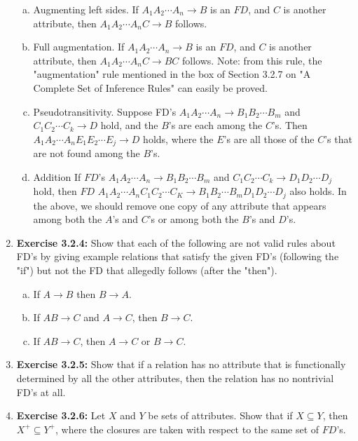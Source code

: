 \documentclass[12pt]{article}
\begin{document}
\begin{enumerate}[1.]
    \begin{enumerate}[a)]
        \item Augmenting left sides. If $A_1 A_2 \cdots A_n \to B$ is an $FD$, and $C$ is another attribute, then $A_1 A_2 \cdots A_nC \to B$ follows.
        \item Full augmentation. If $A_1 A_2 \cdots  A_n \to B$ is an $FD$, and $C$ is another attribute, then $A_1A_2 \cdots  A_nC \to BC$ follows. Note: from this rule, the "augmentation" rule mentioned in the box of Section 3.2.7 on "A Complete Set of Inference Rules" can easily be proved.
        \item Pseudotransitivity. Suppose FD's $A_1 A_2 \cdots  A_n \to B_1B_2 \cdots  B_m$ and $C_1C_2 \cdots C_k \to D$ hold, and the $B$'s are each among the $C$'s. Then $A_1A_2 \cdots A_n E_1 E_2 \cdots E_j \to D$  holds, where the $E$'s are all those of the $C$'s that are not found among the $B$'s.
        \item Addition If $FD$'s $A_1A_2 \cdots A_n \to B_1B_2 \cdots B_m$ and $C_1C_2 \cdots C_k \to D_1D_2 \cdots D_j$ hold, then $FD$ $A_1A_2 \cdots A_nC_1C_2 \cdots C_K \to B_1B_2 \cdots B_m D_1D_2 \cdots D_j$ also holds. In the above, we should remove one copy of any attribute that appears among both the $A$'s and $C$'s or among both the $B$'s and $D$'s.
    \end{enumerate}

    \item \textbf{Exercise 3.2.4:} Show that each of the following are not valid rules about FD's
    by giving example relations that satisfy the given FD's (following the "if") but
    not the FD that allegedly follows (after the "then").

    \bigskip

    \begin{enumerate}[a)]
        \item If $A \to B$ then $B \to A$.
        \item If $AB \to C$ and $A \to C$, then $B \to C$.
        \item If $AB \to C$, then $A \to C$ or $B \to C$.
    \end{enumerate}

    \item \textbf{Exercise 3.2.5:} Show that if a relation has no attribute that is functionally
    determined by all the other attributes, then the relation has no nontrivial FD's
    at all.

    \item \textbf{Exercise 3.2.6:} Let $X$ and $Y$ be sets of attributes. Show that if $X \subseteq Y$, then
    $X^+ \subseteq Y^+$, where the closures are taken with respect to the same set of $FD$'s.


\end{enumerate}
\end{document}

